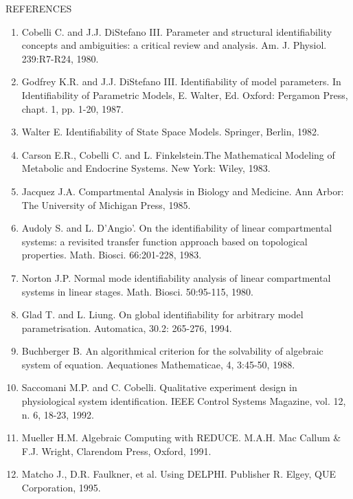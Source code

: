 {\Large REFERENCES}

\begin{enumerate}

\item
Cobelli C. and J.J. DiStefano III. Parameter and structural identifiability concepts and
    ambiguities: a critical review and analysis. Am. J. Physiol. 239:R7-R24, 1980. 


\item
Godfrey K.R. and J.J. DiStefano III. Identifiability of model parameters. In Identifiability of
    Parametric Models, E. Walter, Ed. Oxford: Pergamon Press, chapt. 1, pp. 1-20, 1987. 


\item
Walter E. Identifiability of State Space Models. Springer, Berlin, 1982. 


\item
Carson E.R., Cobelli C. and L. Finkelstein.The Mathematical Modeling of Metabolic and
    Endocrine Systems. New York: Wiley, 1983. 


\item
Jacquez J.A. Compartmental Analysis in Biology and Medicine. Ann Arbor: The University
    of Michigan Press, 1985. 


\item
Audoly S. and L. D'Angio'. On the identifiability of linear compartmental systems: a
    revisited transfer function approach based on topological properties. Math. Biosci.
    66:201-228, 1983. 


\item
Norton J.P. Normal mode identifiability analysis of linear compartmental systems in linear
    stages. Math. Biosci. 50:95-115, 1980. 


\item
Glad T. and L. Liung. On global identifiability for arbitrary model parametrisation.
    Automatica, 30.2: 265-276, 1994. 


\item
Buchberger B. An algorithmical criterion for the solvability of algebraic system of equation.
    Aequationes Mathematicae, 4, 3:45-50, 1988. 


\item
Saccomani M.P. and C. Cobelli. Qualitative experiment design in physiological system
    identification. IEEE Control Systems Magazine, vol. 12, n. 6, 18-23, 1992. 


\item
Mueller H.M. Algebraic Computing with REDUCE. M.A.H. Mac Callum \& F.J. Wright,
    Clarendom Press, Oxford, 1991. 


\item
Matcho J., D.R. Faulkner, et al. Using DELPHI. Publisher R. Elgey, QUE Corporation,
    1995. 

\end{enumerate}



